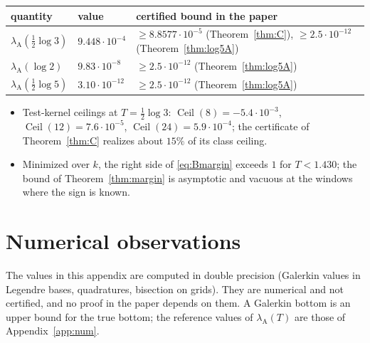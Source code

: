 \documentclass[11pt]{amsart}
\theoremstyle{definition}
\theoremstyle{remark}
\newcommand{\lamA}{\lambda_{\mathrm A}(T)}
\begin{document}
\begin{center}\small
\begin{tabular}{@{}lll@{}}
\toprule
quantity & value & certified bound in the paper\\
\midrule
$\lambda_{\mathrm A}(\frac12\log3)$ & $9.448\cdot10^{-4}$ & $\ge8.8577\cdot10^{-5}$ (Theorem~\ref{thm:C}), $\ge2.5\cdot10^{-12}$ (Theorem~\ref{thm:log5A})\\
$\lambda_{\mathrm A}(\log2)$ & $9.83\cdot10^{-8}$ & $\ge2.5\cdot10^{-12}$ (Theorem~\ref{thm:log5A})\\
$\lambda_{\mathrm A}(\frac12\log5)$ & $3.10\cdot10^{-12}$ & $\ge2.5\cdot10^{-12}$ (Theorem~\ref{thm:log5A})\\
\bottomrule
\end{tabular}
\end{center}

\begin{itemize}
\item Test-kernel ceilings at $T=\frac12\log3$: $\operatorname{Ceil}(8)=-5.4\cdot10^{-3}$,
$\operatorname{Ceil}(12)=7.6\cdot10^{-5}$, $\operatorname{Ceil}(24)=5.9\cdot10^{-4}$; the certificate of
Theorem~\ref{thm:C} realizes about $15\%$ of its class ceiling.
\item Minimized over $k$, the right side of \eqref{eq:Bmargin} exceeds $1$ for $T<1.430$; the bound of
Theorem~\ref{thm:margin} is asymptotic and vacuous at the windows where the sign is known.
\end{itemize}


\section{Numerical observations}\label{app:diag}

The values in this appendix are computed in double precision (Galerkin values in Legendre bases, quadratures,
bisection on grids). They are numerical and not certified, and no proof in the paper depends on them. A Galerkin
bottom is an upper bound for the true bottom; the reference values of $\lamA$ are those of Appendix~\ref{app:num}.
\end{document}
